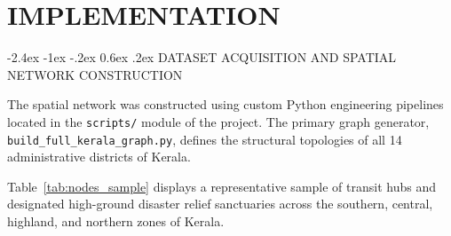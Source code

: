 \documentclass[12pt,oneside]{report}
\makeatletter
\renewcommand{\section}{\@startsection{section}{1}{\z@}%
  {-2.4ex \@plus -1ex \@minus -.2ex}%
  {0.6ex \@plus .2ex}%
  {\normalfont\large\bfseries}}
\newcommand{\chapterpage}[1]{\chapter{#1}}
\makeatother
\begin{document}
\clearpage

\chapterpage{IMPLEMENTATION}

\section{DATASET ACQUISITION AND SPATIAL NETWORK CONSTRUCTION}

The spatial network was constructed using custom Python engineering pipelines located in the \texttt{scripts/} module of the project. The primary graph generator, \texttt{build\_full\_kerala\_graph.py}, defines the structural topologies of all 14 administrative districts of Kerala.

Table~\ref{tab:nodes_sample} displays a representative sample of transit hubs and designated high-ground disaster relief sanctuaries across the southern, central, highland, and northern zones of Kerala.
\end{document}

